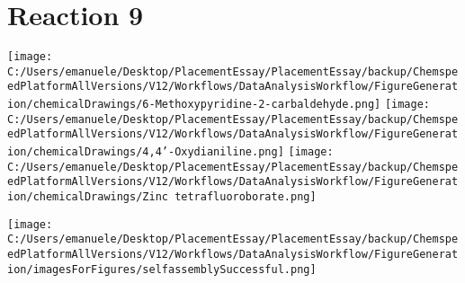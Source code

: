 \documentclass{article}%
\begin{document}
\section*{Reaction 9}%
%
\begin{scheme}[H]%
\begin{minipage}{0.5\textwidth}%
\texttt{[image: C:/Users/emanuele/Desktop/PlacementEssay/PlacementEssay/backup/ChemspeedPlatformAllVersions/V12/Workflows/DataAnalysisWorkflow/FigureGeneration/chemicalDrawings/6-Methoxypyridine-2-carbaldehyde.png]}%
\texttt{[image: C:/Users/emanuele/Desktop/PlacementEssay/PlacementEssay/backup/ChemspeedPlatformAllVersions/V12/Workflows/DataAnalysisWorkflow/FigureGeneration/chemicalDrawings/4,4'-Oxydianiline.png]}%
\texttt{[image: C:/Users/emanuele/Desktop/PlacementEssay/PlacementEssay/backup/ChemspeedPlatformAllVersions/V12/Workflows/DataAnalysisWorkflow/FigureGeneration/chemicalDrawings/Zinc tetrafluoroborate.png]}%
\end{minipage}%
\begin{minipage}{0.5\textwidth}%
\begin{center}%
\texttt{[image: C:/Users/emanuele/Desktop/PlacementEssay/PlacementEssay/backup/ChemspeedPlatformAllVersions/V12/Workflows/DataAnalysisWorkflow/FigureGeneration/imagesForFigures/selfassemblySuccessful.png]}%
\end{center}%
\end{minipage}%
\caption{Self-assembly of components 6, 15, with Zinc(II) in a 3.0:1.5:1.0 molar ratio in CH$_3$CN at 60\textdegree C for 40h. These are the reagents (starting materials) for reaction 9.}%
\end{scheme}%
\end{document}
